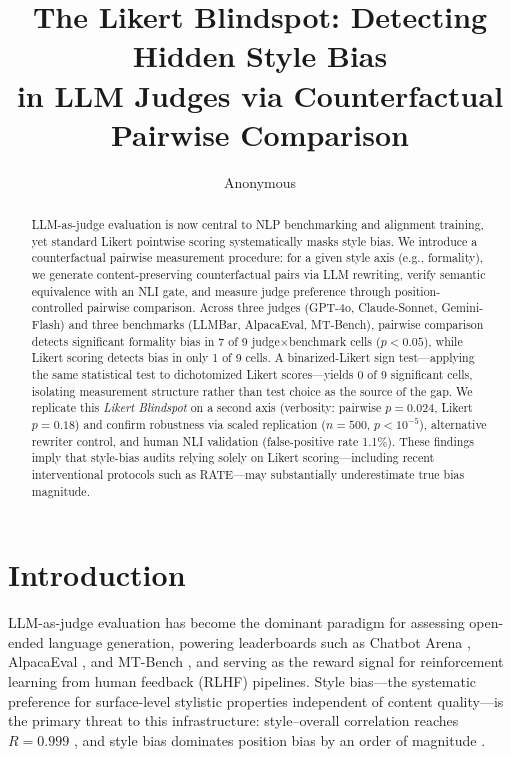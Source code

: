 \documentclass[11pt]{article}
\title{The Likert Blindspot: Detecting Hidden Style Bias\\in LLM Judges via Counterfactual Pairwise Comparison}
\author{Anonymous}
\begin{document}
\maketitle

\begin{abstract}
LLM-as-judge evaluation is now central to NLP benchmarking and alignment training, yet standard Likert pointwise scoring systematically masks style bias.
We introduce a counterfactual pairwise measurement procedure: for a given style axis (e.g., formality), we generate content-preserving counterfactual pairs via LLM rewriting, verify semantic equivalence with an NLI gate, and measure judge preference through position-controlled pairwise comparison.
Across three judges (GPT-4o, Claude-Sonnet, Gemini-Flash) and three benchmarks (LLMBar, AlpacaEval, MT-Bench), pairwise comparison detects significant formality bias in 7 of 9 judge$\times$benchmark cells ($p < 0.05$), while Likert scoring detects bias in only 1 of 9 cells. A binarized-Likert sign test---applying the same statistical test to dichotomized Likert scores---yields 0 of 9 significant cells, isolating measurement structure rather than test choice as the source of the gap.
We replicate this \emph{Likert Blindspot} on a second axis (verbosity: pairwise $p = 0.024$, Likert $p = 0.18$) and confirm robustness via scaled replication ($n = 500$, $p < 10^{-5}$), alternative rewriter control, and human NLI validation (false-positive rate 1.1\%).
These findings imply that style-bias audits relying solely on Likert scoring---including recent interventional protocols such as RATE---may substantially underestimate true bias magnitude.
\end{abstract}

\section{Introduction}

LLM-as-judge evaluation has become the dominant paradigm for assessing open-ended language generation, powering leaderboards such as Chatbot Arena \cite{zheng2023judging}, AlpacaEval \cite{li2023alpacaeval}, and MT-Bench \cite{zheng2023judging}, and serving as the reward signal for reinforcement learning from human feedback (RLHF) pipelines.
Style bias---the systematic preference for surface-level stylistic properties independent of content quality---is the primary threat to this infrastructure: style--overall correlation reaches $R=0.999$ \cite{park2024sosbench}, and style bias dominates position bias by an order of magnitude \cite{soumik2026judging}.
\end{document}
